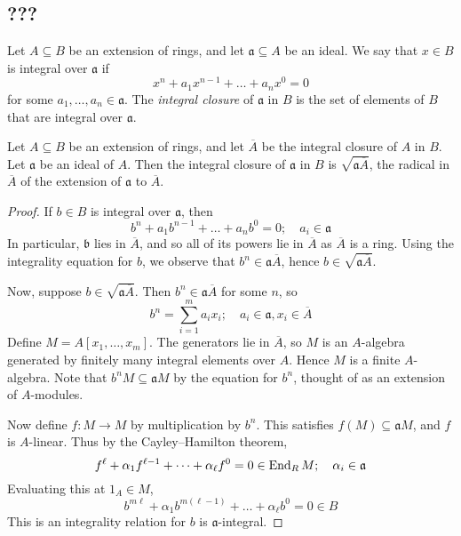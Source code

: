 \subsection{???}
\begin{definition}
    Let \( A \subseteq B \) be an extension of rings, and let \( \mathfrak a \subseteq A \) be an ideal.
    We say that \( x \in B \) is integral over \( \mathfrak a \) if
    \[ x^n + a_1 x^{n-1} + \dots + a_n x^0 = 0 \]
    for some \( a_1, \dots, a_n \in \mathfrak a \).
    The \emph{integral closure} of \( \mathfrak a \) in \( B \) is the set of elements of \( B \) that are integral over \( \mathfrak a \).
\end{definition}
\begin{proposition}
    Let \( A \subseteq B \) be an extension of rings, and let \( \overline A \) be the integral closure of \( A \) in \( B \).
    Let \( \mathfrak a \) be an ideal of \( A \).
    Then the integral closure of \( \mathfrak a \) in \( B \) is \( \sqrt{\mathfrak a \overline A} \), the radical in \( \overline A \) of the extension of \( \mathfrak a \) to \( \overline A \).
\end{proposition}
\begin{proof}
    If \( b \in B \) is integral over \( \mathfrak a \), then
    \[ b^n + a_1 b^{n-1} + \dots + a_n b^0 = 0;\quad a_i \in \mathfrak a \]
    In particular, \( \mathfrak b \) lies in \( \overline A \), and so all of its powers lie in \( \overline A \) as \( \overline A \) is a ring.
    Using the integrality equation for \( b \), we observe that \( b^n \in \mathfrak a \overline A \), hence \( b \in \sqrt{\mathfrak a \overline A} \).
    
    Now, suppose \( b \in \sqrt{\mathfrak a \overline A} \).
    Then \( b^n \in \mathfrak a \overline A \) for some \( n \), so
    \[ b^n = \sum_{i=1}^m a_i x_i;\quad a_i \in \mathfrak a, x_i \in \overline A \]
    Define \( M = A[x_1, \dots, x_m] \).
    The generators lie in \( \overline A \), so \( M \) is an \( A \)-algebra generated by finitely many integral elements over \( A \).
    Hence \( M \) is a finite \( A \)-algebra.
    Note that \( b^n M \subseteq \mathfrak a M \) by the equation for \( b^n \), thought of as an extension of \( A \)-modules.

    Now define \( f : M \to M \) by multiplication by \( b^n \).
    This satisfies \( f(M) \subseteq \mathfrak a M \), and \( f \) is \( A \)-linear.
    Thus by the Cayley--Hamilton theorem,
    \[ f^\ell + \alpha_1 f^{\ell - 1} + \dots + \alpha_\ell f^0 = 0 \in \operatorname{End}_R M;\quad \alpha_i \in \mathfrak a \]
    Evaluating this at \( 1_A \in M \),
    \[ b^{m\ell} + \alpha_1 b^{m(\ell - 1)} + \dots + \alpha_\ell b^0 = 0 \in B \]
    This is an integrality relation for \( b \) is \( \mathfrak a \)-integral.
\end{proof}
